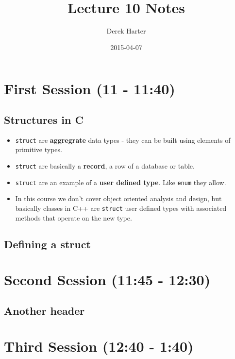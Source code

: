 \documentclass[11pt]{article}
\title{Lecture 10 Notes}
\author{Derek Harter}
\date{2015-04-07}
\begin{document}
\maketitle


\section{First Session (11 - 11:40)}
\label{sec-1}
\subsection{Structures in C}
\label{sec-1-1}

\begin{itemize}
\item \verb~struct~ are \textbf{aggregrate} data types - they can be built using
  elements of primitive types.
\item \verb~struct~ are basically a \textbf{record}, a row of a database or table.
\item \verb~struct~ are an example of a \textbf{user defined type}.  Like \verb~enum~ they
  allow.
\item In this course we don't cover object oriented analysis and design,
  but basically classes in C++ are \verb~struct~ user defined types with
  associated methods that operate on the new type.
\end{itemize}
\subsection{Defining a struct}
\label{sec-1-2}
\section{Second Session (11:45 - 12:30)}
\label{sec-2}
\subsection{Another header}
\label{sec-2-1}
\section{Third Session (12:40 - 1:40)}
\label{sec-3}
\end{document}
